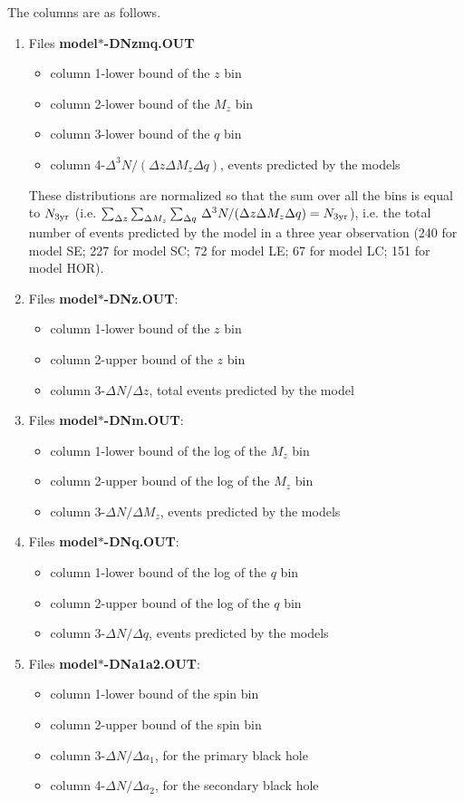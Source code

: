 \documentclass{iopart}
\begin{document}
The columns are as follows.
\begin{enumerate}
\item Files {\bf model$*$-DNzmq.OUT}
\begin{itemize}
\item column 1-lower bound of the $z$ bin
\item column 2-lower bound of the $M_z$ bin
\item column 3-lower bound of the $q$ bin
\item column 4-$\Delta^3N/(\Delta{z}\Delta{M_z}\Delta{q})$, events predicted by 
the models 
\end{itemize}
These distributions are normalized so that the sum over all the bins is equal to
$N_{3{\rm yr}}$ (i.e. $\sum_{\Delta{z}}\sum_{\Delta{M_z}}\sum_{\Delta{q}}\,\Delta^3N/(\Delta{z}\Delta{M_z}\Delta{q})=N_{3{\rm yr}}$), i.e. the total number of events predicted by the model in a three year observation (240 for model SE; 227 for model SC; 72 for 
model LE; 67 for model LC; 151 for model HOR).
\item Files {\bf model$*$-DNz.OUT}:
\begin{itemize}
\item column 1-lower bound of the $z$ bin
\item column 2-upper bound of the $z$ bin
\item column 3-$\Delta{N}/\Delta{z}$, total events predicted by 
the model 
\end{itemize}
\item Files {\bf model$*$-DNm.OUT}:
\begin{itemize}
\item column 1-lower bound of the log of the $M_z$ bin
\item column 2-upper bound of the log of the $M_z$ bin
\item column 3-$\Delta{N}/\Delta{M_z}$, events predicted by 
the models 
\end{itemize}
\item Files {\bf model$*$-DNq.OUT}:
\begin{itemize}
\item column 1-lower bound of the log of the $q$ bin
\item column 2-upper bound of the log of the $q$ bin
\item column 3-$\Delta{N}/\Delta{q}$, events predicted by 
the models 
\end{itemize}
\item Files {\bf model$*$-DNa1a2.OUT}:
\begin{itemize}
\item column 1-lower bound of the spin bin
\item column 2-upper bound of the spin bin
\item column 3-$\Delta{N}/\Delta{a_1}$, for the primary black hole
\item column 4-$\Delta{N}/\Delta{a_2}$, for the secondary black hole
\end{itemize}
\end{enumerate}
\end{document}
